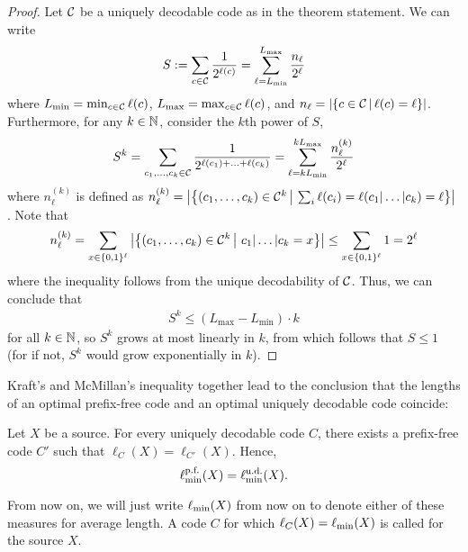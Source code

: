 \begin{proof}
Let ${\cal C}$ be a uniquely decodable code as in the theorem statement. We can write
\begin{align}
S := \sum_{c \in \cal C} \frac{1}{2^{\len(c)}} = \sum_{\ell = L_{\min}}^{L_{\max}} \frac{n_\ell}{2^\ell} 
\end{align}
where $L_{\min} = \min_{c \in \cal C} \len(c)$, $L_{\max} = \max_{c \in \cal C} \len(c)$, and $n_{\ell} = |\Set{c \in {\cal C}}{\len(c) = \ell}|$. Furthermore, for any $k \in \N$,  consider the $k$th power of $S$,
\begin{align}
S^k = \sum_{c_1,\ldots,c_k \in \cal C} \frac{1}{2^{\len(c_1)+\ldots+\len(c_k)}} = \sum_{\ell = k L_{\min}}^{k L_{\max}} \frac{n_\ell^{(k)}}{2^\ell} 
\end{align}
where $n_\ell^{(k)}$ is defined as $n_\ell^{(k)} = \big|\SET[\big]{(c_1,\ldots,c_k) \in {\cal C}^k}{\sum_i\len(c_i) = \len(c_1|\ldots|c_k) = \ell}\big|$. Note that
\begin{align}
n_\ell^{(k)} = \sum_{x \in \set{0,1}^{\ell}} \big|\SET{(c_1,\ldots,c_k) \in {\cal C}^k}{\,c_1|\ldots|c_k = x}\big| \leq \sum_{x \in \set{0,1}^{\ell}} 1 = 2^{\ell}
\end{align}
where the inequality follows from the unique decodability of $\cal C$. Thus, we can conclude that 
\begin{align}
S^k \leq (L_{\max} - L_{\min}) \cdot k 
\end{align}
for all $k \in \N$, so $S^k$ grows at most linearly in $k$, from which follows that $S \leq 1$ (for if not, $S^k$ would grow exponentially in $k$).
\end{proof}
Kraft's and McMillan's inequality together lead to the conclusion that the lengths of an optimal prefix-free code and an optimal uniquely decodable code coincide:
\begin{corollary}
Let $X$ be a source. For every uniquely decodable code $C$, there exists a prefix-free code $C'$ such that $\ell_C(X) = \ell_{C'}(X)$. Hence,
\[
\ell_{\min}^{\text{\rm p.f.}}(X) = \ell_{\min}^{\text{\rm u.d.}}(X).
\]
\end{corollary}
From now on, we will just write $\len_{\min}(X)$ from now on to denote either of these measures for average length. A code $C$ for which $\len_C(X) = \len_{\min}(X)$ is called  for the source $X$. 




